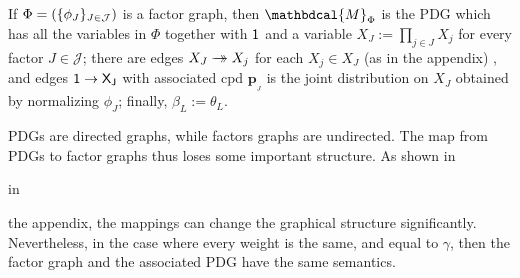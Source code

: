 \documentclass{article}
\theoremstyle{plain}
\theoremstyle{definition}
\theoremstyle{remark}
\newcommand\mat[1]{\mathbf{#1}}
\newcommand{\commentout}[1]{\ignorespaces}
\newcommand{\tto}{\rightarrow\mathrel{\mspace{-15mu}}\rightarrow}
\newcommand{\bp}[1][L]{\mat{p}_{\!_{#1}\!}}
\newcommand{\dg}[1]{\mathbdcal{#1}}
\newcommand{\PDGof}[1]{{\dg M}_{#1}}
\newcommand{\begthm}[2]{\begin{#1}[restate=#2,label=#2]}
\numberwithin{equation}{section}
\begin{document}
\begin{defn} \label{def:fg2PDG}
If $\Phi=(\{\phi_J\}_{J \in \cal J})$ is a factor graph, then 
$\PDGof{\Phi}$ is the PDG which has all the variables in $\Phi$
together with $\sf 1$ and a variable
$X_J := \prod_{j \in J} X_j$ for every factor $J \in \mathcal J$;
there are edges $X_J \tto X_j$ for each $X_j \in X_J$
(as in the appendix)
, and edges $\sf 1 \to X_J$ with
associated cpd $\bp[J]$ is the joint distribution on $X_J$ obtained by
normalizing $\phi_J$; finally, $\beta_L := \theta_L$.
\end{defn}

PDGs are directed graphs, while factors graphs are undirected.  The
map from PDGs to factor graphs thus loses some important structure.
As shown in 
\begin{vfull}
 in
\end{vfull}
the appendix,
the mappings can change the graphical structure significantly.
Nevertheless, in the case where every weight is the same, and equal to $\gamma$,
then the factor graph and the associated PDG have the same semantics.  

\commentout{
	\begthm{prop}{prop:fg-pdg-lossless}
		$\Phi \circ \PDGof = \mathrm{Id}_{\text{FG}}$. That is, if $F$ is a factor graph, then $\Pr_{\Phi(\PDGof{F})} = \Pr_F$.
	\end{prop}
}
\end{document}
